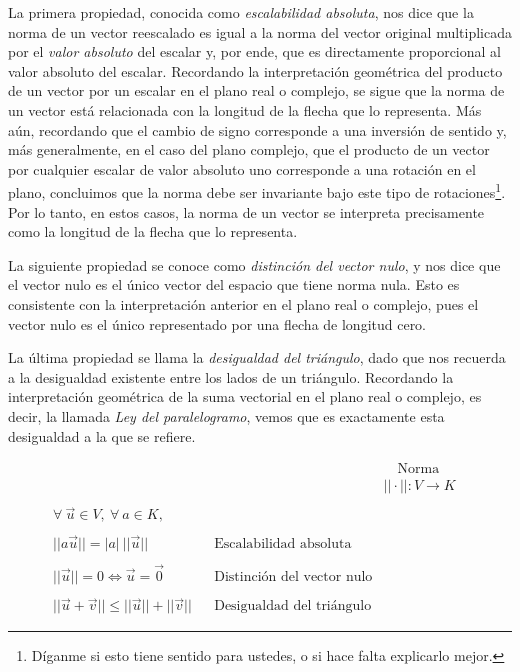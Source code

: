 \documentclass[12pt,dvipsnames]{article}
\numberwithin{equation}{section}
\begin{document}
La primera propiedad, conocida como \emph{escalabilidad absoluta}, nos dice que la norma de un vector reescalado es igual a la norma del vector original multiplicada por el \emph{valor absoluto} del escalar y, por ende, que es directamente proporcional al valor absoluto del escalar. Recordando la interpretación geométrica del producto de un vector por un escalar en el plano real o complejo, se sigue que la norma de un vector está relacionada con la longitud de la flecha que lo representa. Más aún, recordando que el cambio de signo corresponde a una inversión de sentido y, más generalmente, en el caso del plano complejo, que el producto de un vector por cualquier escalar de valor absoluto uno corresponde a una rotación en el plano, concluimos que la norma debe ser invariante bajo este tipo de rotaciones\footnote{Díganme si esto tiene sentido para ustedes, o si hace falta explicarlo mejor.}. Por lo tanto, en estos casos, la norma de un vector se interpreta precisamente como la longitud de la flecha que lo representa.

La siguiente propiedad se conoce como \emph{distinción del vector nulo}, y nos dice que el vector nulo es el único vector del espacio que tiene norma nula. Esto es consistente con la interpretación anterior en el plano real o complejo, pues el vector nulo es el único representado por una flecha de longitud cero.

La última propiedad se llama la \emph{desigualdad del triángulo}, dado que nos recuerda a la desigualdad existente entre los lados de un triángulo. Recordando la interpretación geométrica de la suma vectorial en el plano real o complejo, es decir, la llamada \emph{Ley del paralelogramo}, vemos que es exactamente esta desigualdad a la que se refiere.

\begin{align*}
     & & &\quad \text{Norma}& \\
     & & &||\cdot||:V\to K& \\
     \\
     \forall \ \vec{u}\in V, \ \forall \ a\in K, \\
     \\
     ||a\vec{u}|| = |a| \ ||\vec{u}|| & &\text{Escalabilidad absoluta}\\
     \\
     ||\vec{u}|| = 0 \iff \vec{u} = \vec{0} & &\text{Distinción del vector nulo}\\
     \\
     ||\vec{u}+\vec{v}|| \le ||\vec{u}|| + ||\vec{v}|| & &\text{Desigualdad del triángulo}
\end{align*}
\end{document}

